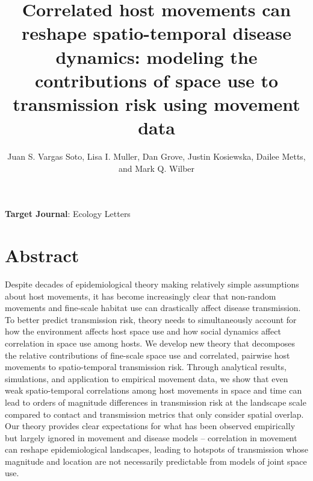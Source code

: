 \documentclass[letterpaper]{article}
\title{Correlated host movements can reshape spatio-temporal disease dynamics: modeling the contributions of space use to transmission risk using movement data}
\author{Juan S. Vargas Soto, Lisa I. Muller, Dan Grove, Justin Kosiewska, Dailee Metts, and Mark Q. Wilber}
\affil{School of Natural Resources, University of Tennessee, Knoxville, TN}
\date{}
\begin{document}
\maketitle

\noindent
\textbf{Target Journal}: Ecology Letters

\section*{Abstract}

Despite decades of epidemiological theory making relatively simple assumptions about host movements, it has become increasingly clear that non-random movements and fine-scale habitat use can drastically affect disease transmission. To better predict transmission risk, theory needs to simultaneously account for how the environment affects host space use and how social dynamics affect correlation in space use among hosts. We develop new theory that decomposes the relative contributions of fine-scale space use and correlated, pairwise host movements to spatio-temporal transmission risk. Through analytical results, simulations, and application to empirical movement data, we show that even weak spatio-temporal correlations among host movements in space and time can lead to orders of magnitude differences in transmission risk at the landscape scale compared to contact and transmission metrics that only consider spatial overlap. Our theory provides clear expectations for what has been observed empirically but largely ignored in movement and disease models -- correlation in movement can reshape epidemiological landscapes, leading to hotspots of transmission whose magnitude and location are not necessarily predictable from models of joint space use.
\end{document}
